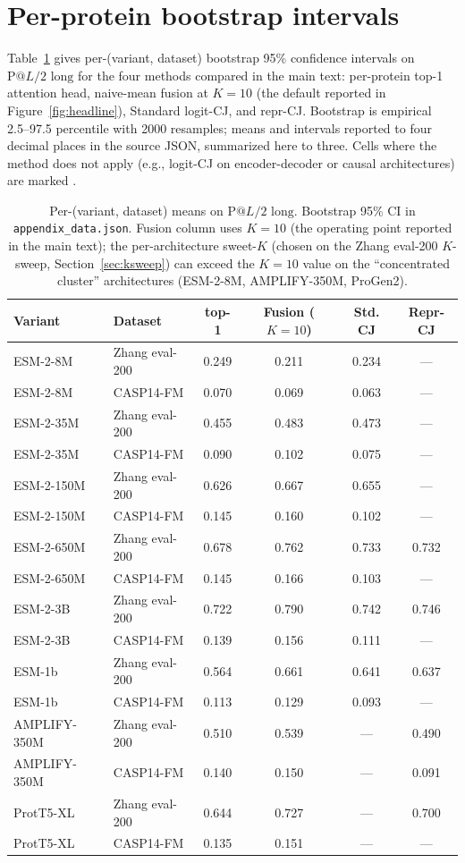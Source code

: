 \documentclass{article}
\begin{document}
\section{Per-protein bootstrap intervals}
\label{app:a1}

Table~\ref{tab:a1} gives per-(variant, dataset) bootstrap 95\% confidence
intervals on $\text{P}@L/2 \text{ long}$ for the four methods compared in the
main text: per-protein top-1 attention head, naive-mean fusion at $K=10$
(the default reported in Figure~\ref{fig:headline}), Standard logit-CJ, and
repr-CJ. Bootstrap is empirical 2.5--97.5 percentile with
2000 resamples; means and intervals reported to four decimal places in
the source JSON, summarized here to three. Cells where the method
does not apply
(e.g., logit-CJ on encoder-decoder or causal architectures) are marked
\textemdash.

\begin{table}[h]
\centering
\small
\caption{Per-(variant, dataset) means on $\text{P}@L/2 \text{ long}$.
Bootstrap 95\% CI in \texttt{appendix\_data.json}. Fusion column uses
$K{=}10$ (the operating point reported in the main text); the
per-architecture sweet-$K$ (chosen on the Zhang eval-200 $K$-sweep,
Section~\ref{sec:ksweep}) can exceed the $K{=}10$ value on the
``concentrated cluster'' architectures (ESM-2-8M, AMPLIFY-350M, ProGen2).}
\label{tab:a1}
\begin{tabular}{llcccc}
\toprule
Variant & Dataset & top-1 & Fusion ($K{=}10$) & Std. CJ & Repr-CJ \\
\midrule
ESM-2-8M     & Zhang eval-200 & 0.249 & 0.211 & 0.234 & --- \\
ESM-2-8M     & CASP14-FM & 0.070 & 0.069 & 0.063 & --- \\
ESM-2-35M    & Zhang eval-200 & 0.455 & 0.483 & 0.473 & --- \\
ESM-2-35M    & CASP14-FM & 0.090 & 0.102 & 0.075 & --- \\
ESM-2-150M   & Zhang eval-200 & 0.626 & 0.667 & 0.655 & --- \\
ESM-2-150M   & CASP14-FM & 0.145 & 0.160 & 0.102 & --- \\
ESM-2-650M   & Zhang eval-200 & 0.678 & 0.762 & 0.733 & 0.732 \\
ESM-2-650M   & CASP14-FM & 0.145 & 0.166 & 0.103 & --- \\
ESM-2-3B     & Zhang eval-200 & 0.722 & 0.790 & 0.742 & 0.746 \\
ESM-2-3B     & CASP14-FM & 0.139 & 0.156 & 0.111 & --- \\
ESM-1b       & Zhang eval-200 & 0.564 & 0.661 & 0.641 & 0.637 \\
ESM-1b       & CASP14-FM & 0.113 & 0.129 & 0.093 & --- \\
AMPLIFY-350M & Zhang eval-200 & 0.510 & 0.539 & --- & 0.490 \\
AMPLIFY-350M & CASP14-FM & 0.140 & 0.150 & --- & 0.091 \\
ProtT5-XL    & Zhang eval-200 & 0.644 & 0.727 & --- & 0.700 \\
ProtT5-XL    & CASP14-FM & 0.135 & 0.151 & --- & --- \\
\bottomrule
\end{tabular}
\end{table}
\end{document}
